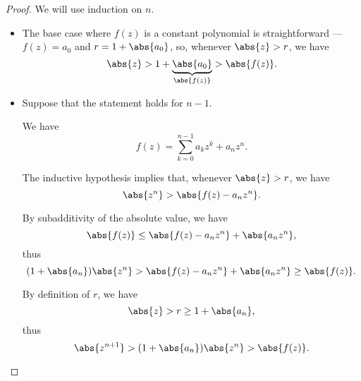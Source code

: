 \begin{proof}
  We will use induction on \( n \).
  \begin{itemize}
    \item The base case where \( f(z) \) is a constant polynomial is straightforward --- \( f(z) = a_0 \) and \( r = 1 + \abs{a_0} \), so, whenever \( \abs{z} > r \), we have
    \begin{equation*}
      \abs{z} > 1 + \underbrace{\abs{a_0}}_{\abs{f(z)}} > \abs{f(z)}.
    \end{equation*}

    \item Suppose that the statement holds for \( n - 1 \).

    We have
    \begin{equation*}
      f(z) = \sum_{k=0}^{n-1} a_k z^k + a_n z^n.
    \end{equation*}

    The inductive hypothesis implies that, whenever \( \abs{z} > r \), we have
    \begin{equation*}
      \abs{z^n} > \abs{f(z) - a_n z^n}.
    \end{equation*}

    By subadditivity of the absolute value, we have
    \begin{equation*}
      \abs{f(z)} \leq \abs{f(z) - a_n z^n} + \abs{a_n z^n},
    \end{equation*}
    thus
    \begin{equation*}
      (1 + \abs{a_n}) \abs{z^n} > \abs{f(z) - a_n z^n} + \abs{a_n z^n} \geq \abs{f(z)}.
    \end{equation*}

    By definition of \( r \), we have
    \begin{equation*}
      \abs{z} > r \geq 1 + \abs{a_n},
    \end{equation*}
    thus
    \begin{equation*}
      \abs{z^{n+1}} > (1 + \abs{a_n}) \abs{z^n} > \abs{f(z)}.
    \end{equation*}
  \end{itemize}
\end{proof}

